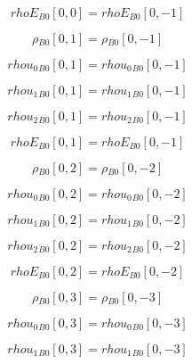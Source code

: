 \documentclass{article}
\begin{document}
\begin{dmath}{rhoE{_{B0}}}[{0,0}] = {rhoE{_{B0}}}[{0,-1}]\end{dmath}

\begin{dmath}{\rho{_{B0}}}[{0,1}] = {\rho{_{B0}}}[{0,-1}]\end{dmath}

\begin{dmath}{rhou_{0}{_{B0}}}[{0,1}] = {rhou_{0}{_{B0}}}[{0,-1}]\end{dmath}

\begin{dmath}{rhou_{1}{_{B0}}}[{0,1}] = {rhou_{1}{_{B0}}}[{0,-1}]\end{dmath}

\begin{dmath}{rhou_{2}{_{B0}}}[{0,1}] = {rhou_{2}{_{B0}}}[{0,-1}]\end{dmath}

\begin{dmath}{rhoE{_{B0}}}[{0,1}] = {rhoE{_{B0}}}[{0,-1}]\end{dmath}

\begin{dmath}{\rho{_{B0}}}[{0,2}] = {\rho{_{B0}}}[{0,-2}]\end{dmath}

\begin{dmath}{rhou_{0}{_{B0}}}[{0,2}] = {rhou_{0}{_{B0}}}[{0,-2}]\end{dmath}

\begin{dmath}{rhou_{1}{_{B0}}}[{0,2}] = {rhou_{1}{_{B0}}}[{0,-2}]\end{dmath}

\begin{dmath}{rhou_{2}{_{B0}}}[{0,2}] = {rhou_{2}{_{B0}}}[{0,-2}]\end{dmath}

\begin{dmath}{rhoE{_{B0}}}[{0,2}] = {rhoE{_{B0}}}[{0,-2}]\end{dmath}

\begin{dmath}{\rho{_{B0}}}[{0,3}] = {\rho{_{B0}}}[{0,-3}]\end{dmath}

\begin{dmath}{rhou_{0}{_{B0}}}[{0,3}] = {rhou_{0}{_{B0}}}[{0,-3}]\end{dmath}

\begin{dmath}{rhou_{1}{_{B0}}}[{0,3}] = {rhou_{1}{_{B0}}}[{0,-3}]\end{dmath}
\end{document}
